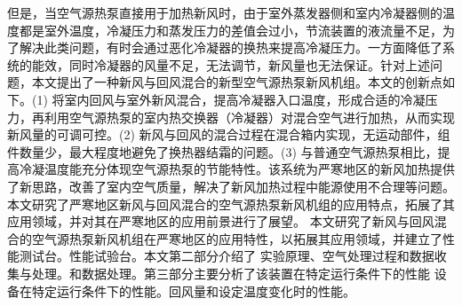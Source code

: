  但是，当空气源热泵直接用于加热新风时，由于室外蒸发器侧和室内冷凝器侧的温度都是室外温度，冷凝压力和蒸发压力的差值会过小，节流装置的液流量不足，为了解决此类问题，有时会通过恶化冷凝器的换热来提高冷凝压力。一方面降低了系统的能效，同时冷凝器的风量不足，无法调节，新风量也无法保证。针对上述问题，本文提出了一种新风与回风混合的新型空气源热泵新风机组。本文的创新点如下。(1) 将室内回风与室外新风混合，提高冷凝器入口温度，形成合适的冷凝压力，再利用空气源热泵的室内热交换器（冷凝器）对混合空气进行加热，从而实现新风量的可调可控。(2) 新风与回风的混合过程在混合箱内实现，无运动部件，组件数量少，最大程度地避免了换热器结霜的问题。(3) 与普通空气源热泵相比，提高冷凝温度能充分体现空气源热泵的节能特性。该系统为严寒地区的新风加热提供了新思路，改善了室内空气质量，解决了新风加热过程中能源使用不合理等问题。本文研究了严寒地区新风与回风混合的空气源热泵新风机组的应用特点，拓展了其应用领域，并对其在严寒地区的应用前景进行了展望。 本文研究了新风与回风混合的空气源热泵新风机组在严寒地区的应用特性，以拓展其应用领域，并建立了性能测试台。性能试验台。本文第二部分介绍了 实验原理、空气处理过程和数据收集与处理。和数据处理。第三部分主要分析了该装置在特定运行条件下的性能 设备在特定运行条件下的性能。回风量和设定温度变化时的性能。

